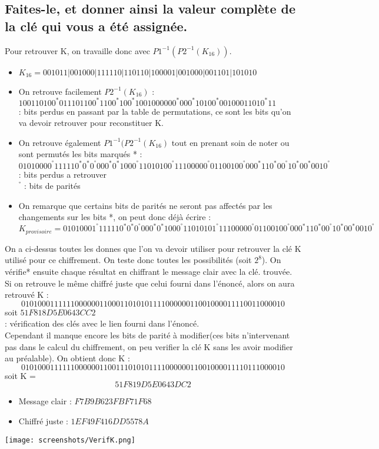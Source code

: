 \documentclass[a4paper,11pt]{article}
\begin{document}
	\subsection{Faites-le, et donner ainsi la valeur complète de la clé qui vous a été assignée.}
	Pour retrouver K, on travaille donc avec $P1^{-1}(P2^{-1}(K_{16}))$.\\
	\begin{itemize}
		\item $K_{16} = 001011|001000|111110|110110|100001|001000|001101|101010$
		\item On retrouve facilement $P2^{-1}(K_{16})$ :\\
		$100110100^{*}011101100^{*}1100^{*}100^{*}1001000000^{*}000^{*}10100^{*}00100011010^{*}11$\\
		\small * : bits perdus en passant par la table de permutations, ce sont les bits qu'on va devoir retrouver pour reconstituer K.
		\item On retrouve également  $P1^{-1}(P2^{-1}(K_{16})$ tout en prenant soin de noter ou sont permutés les bits marqués * :\\
		$01010000^{°}111110^{*}0^{*}0^{°}000^{*}0^{*}1000^{°}11010100^{°}11100000^{°}01100100^{°}000^{*}110^{*}00^{°}10^{*}00^{*}0010^{°}$\\
		\small * : bits perdus a retrouver\\
		\small $^{°}$ : bits de parités\\
		\item On remarque que certains bits de parités ne seront pas affectés par les changements sur les bits *, on peut donc déjà écrire : 
		$$K_{provisoire} = 01010001^{°}111110^{*}0^{*}0^{°}000^{*}0^{*}1000^{°}11010101^{°}11100000^{°}01100100^{°}000^{*}110^{*}00^{°}10^{*}00^{*}0010^{°}$$
	\end{itemize}
	On a ci-dessus toutes les donnes que l'on va devoir utiliser pour retrouver la clé K utilisé pour ce chiffrement. On teste donc toutes les possibilités (soit $2^{8}$).
	On vérifie* ensuite chaque résultat en chiffrant le message clair avec la clé. trouvée. Si on retrouve le même chiffré juste que celui fourni dans l'énoncé, alors on aura retrouvé K :\\
	$$01010001 11111000 00011000 11010101 11100000 01100100 00111100 11000010$$ 
	soit $51F818D5E0643CC2$\\
	\small * : vérification des clés avec le lien fourni dans l'énoncé.\\
	
	Cependant il manque encore les bits de parité à modifier(ces bits n'intervenant pas dans le calcul du chiffrement, on peu verifier la clé K sans les avoir modifier au préalable). On obtient donc K :
	$$01010001 11111000 00011001 11010101 11100000 01100100 00111101 11000010$$
	soit K = 
	$$51F819D5E0643DC2$$
	\begin{itemize}
		\item Message clair : $F7 B9 B6 23 FB F7 1F 68$
		\item Chiffré juste : $1E F4 9F 41 6D D5 57 8A $ 
	\end{itemize}
	\begin{center}\texttt{[image: screenshots/VerifK.png]}\end{center} 
\end{document}
